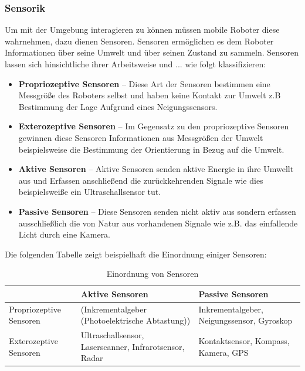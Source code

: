 \subsubsection{Sensorik}
\color{process}
Um mit der Umgebung interagieren zu können müssen mobile Roboter diese wahrnehmen, dazu dienen Sensoren. Sensoren ermöglichen es dem Roboter Informationen über seine Umwelt und über seinen Zustand zu sammeln.
Sensoren lassen sich hinsichtliche ihrer Arbeitsweise und ... wie folgt klassifizieren:
\begin{itemize}
	\item{\textbf{Propriozeptive Sensoren}} -- Diese Art der Sensoren bestimmen eine Messgröße des Roboters selbst und haben keine \glqq{}Kontakt\grqq{} zur Umwelt z.B Bestimmung der Lage Aufgrund eines Neigungssensors.
	\item{\textbf{Exterozeptive Sensoren}} -- Im Gegensatz zu den propriozeptive Sensoren gewinnen diese Sensoren Informationen aus Messgrößen der Umwelt beispielsweise die Bestimmung der Orientierung in Bezug auf die Umwelt.
	\item{\textbf{Aktive Sensoren}} -- Aktive Sensoren senden aktive Energie in ihre Umwellt aus und Erfassen anschließend die zurückkehrenden Signale wie dies beispielsweiße ein Ultraschallsensor tut.
	\item{\textbf{Passive Sensoren}} -- Diese Sensoren senden nicht aktiv aus sondern erfassen ausschließlich die von Natur aus vorhandenen Signale wie z.B. das einfallende Licht durch eine Kamera.
\end{itemize}
Die folgenden Tabelle zeigt beispielhaft die Einordnung einiger Sensoren:
\begin{table}[ht]
	\begin{tabular}{|p{}|p{}|p{}|} \hline
		     	                & Aktive Sensoren      & Passive Sensoren   \\ \hline
		Propriozeptive Sensoren & 
			(Inkrementalgeber (Photoelektrische Abtastung)) & 
			Inkrementalgeber, \newline Neigungssensor, \newline Gyroskop   \\ \hline
		Exterozeptive Sensoren  & 
			Ultraschallsensor,  \newline Laserscanner, \newline Infrarotsensor, \newline Radar    & 
			Kontaktsensor, \newline Kompass, \newline Kamera, \newline GPS      \\ \hline 
	\end{tabular}
	\centering
	\caption[Einordnung von Sensoren]{Einordnung von Sensoren}
\end{table}
